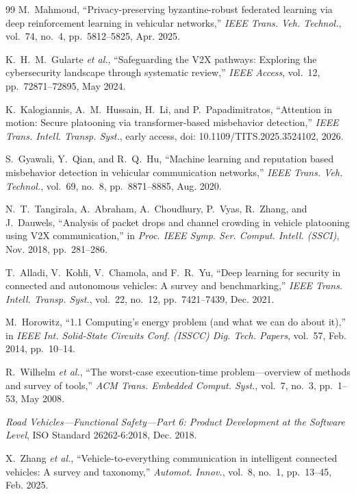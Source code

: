 \documentclass[journal]{IEEEtran}
\begin{document}
\begin{thebibliography}{99}
M.~Mahmoud, ``Privacy-preserving byzantine-robust federated learning via deep reinforcement learning in vehicular networks,'' \emph{IEEE Trans. Veh. Technol.}, vol.~74, no.~4, pp.~5812--5825, Apr. 2025.

K.~H.~M.~Gularte \emph{et al.}, ``Safeguarding the V2X pathways: Exploring the cybersecurity landscape through systematic review,'' \emph{IEEE Access}, vol.~12, pp.~72871--72895, May 2024.

K.~Kalogiannis, A.~M.~Hussain, H.~Li, and P.~Papadimitratos, ``Attention in motion: Secure platooning via transformer-based misbehavior detection,'' \emph{IEEE Trans. Intell. Transp. Syst.}, early access, doi: 10.1109/TITS.2025.3524102, 2026.

S.~Gyawali, Y.~Qian, and R.~Q.~Hu, ``Machine learning and reputation based misbehavior detection in vehicular communication networks,'' \emph{IEEE Trans. Veh. Technol.}, vol.~69, no.~8, pp.~8871--8885, Aug. 2020.

N.~T.~Tangirala, A.~Abraham, A.~Choudhury, P.~Vyas, R.~Zhang, and J.~Dauwels, ``Analysis of packet drops and channel crowding in vehicle platooning using V2X communication,'' in \emph{Proc. IEEE Symp. Ser. Comput. Intell. (SSCI)}, Nov. 2018, pp.~281--286.

T.~Alladi, V.~Kohli, V.~Chamola, and F.~R.~Yu, ``Deep learning for security in connected and autonomous vehicles: A survey and benchmarking,'' \emph{IEEE Trans. Intell. Transp. Syst.}, vol.~22, no.~12, pp.~7421--7439, Dec. 2021.

M.~Horowitz, ``1.1 Computing's energy problem (and what we can do about it),'' in \emph{IEEE Int. Solid-State Circuits Conf. (ISSCC) Dig. Tech. Papers}, vol.~57, Feb. 2014, pp.~10--14.

R.~Wilhelm \emph{et al.}, ``The worst-case execution-time problem---overview of methods and survey of tools,'' \emph{ACM Trans. Embedded Comput. Syst.}, vol.~7, no.~3, pp.~1--53, May 2008.

\emph{Road Vehicles---Functional Safety---Part 6: Product Development at the Software Level}, ISO Standard 26262-6:2018, Dec. 2018.

X.~Zhang \emph{et al.}, ``Vehicle-to-everything communication in intelligent connected vehicles: A survey and taxonomy,'' \emph{Automot. Innov.}, vol.~8, no.~1, pp.~13--45, Feb. 2025.


\end{thebibliography}
\end{document}
